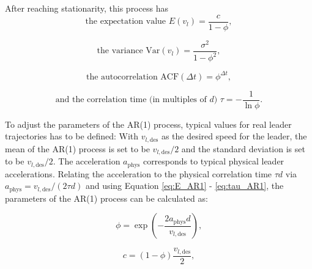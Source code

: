 \documentclass[review]{elsarticle}
\providecommand{\sub}[1]{_{\mathrm{#1}}}  %
\providecommand{\3}{{\ss}}
\begin{document}
After reaching stationarity, this process has 
\begin{equation}
\label{eq:E_AR1}
\text{the expectation value }E(v_l) = \frac{c}{1-\phi}, 
\end{equation}

\begin{equation}
\label{eq:V_AR1}
\text{the variance }\text{Var}(v_l) = \frac{\sigma^2}{1-\phi^2}, 
\end{equation}

\begin{equation}
\label{eq:ACF_AR1}
\text{the autocorrelation  }\text{ACF}(\Delta t) = \phi^{\Delta t}, 
\end{equation}

\begin{equation}
\label{eq:tau_AR1}
\text{and the correlation time (in multiples of $d$) }\tau = -\frac{1}{\ln \phi}. 
\end{equation}
 
To adjust the parameters of the AR(1) process, typical values for real
leader trajectories has to be defined: With $v_{l,\text{des}}$ as the
desired speed for the leader, the mean of the AR(1) process is set to
be $v_{l,\text{des}}/2$ and the standard deviation is set to be
$v_{l,\text{des}}/2$. The acceleration $a\sub{phys}$ corresponds to
typical physical leader accelerations. Relating the acceleration to
the physical correlation time $\tau d$ via 
$a\sub{phys}=v_{l,\text{des}}/(2\tau d)$  and using Equation \eqref{eq:E_AR1} - \eqref{eq:tau_AR1}, the parameters of the AR(1) process can be calculated as:

\begin{equation}
\phi = \exp\left(-\frac{2a\sub{phys}d}{v_{l,\text{des}}}\right),
\end{equation}

\begin{equation}
c=(1-\phi)\frac{v_{l,\text{des}}}{2},
\end{equation}
\end{document}
